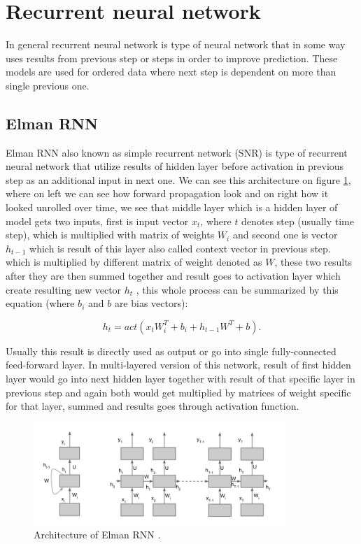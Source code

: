 \section{Recurrent neural network}
\label{theoryRNN}

In general recurrent neural network is type of neural network that in some way uses results from previous step or steps in order to improve prediction. These models are used for ordered data where next step is dependent on more than single previous one.

\subsection{Elman RNN}

Elman RNN also known as simple recurrent network (SNR) is type of recurrent neural network that utilize results of hidden layer before activation in previous step as an additional input in next one. We can see this architecture on figure \ref{fig:elman_arch}, where on left we can see how forward propagation look and on right how it looked unrolled over time, we see that middle layer which is a hidden layer of model gets two inputs, first is input vector $x_t$, where $t$ denotes step (usually time step), which is multiplied with matrix of weights $W_i$ and second one is vector $h_{t-1}$ which is result of this layer also called context vector in previous step. which is multiplied by different matrix of weight denoted as $W$, these two results after they are then summed together and result goes to activation layer which create resulting new vector $h_t$ \cite{elman}, this whole process can be summarized by this equation (where $b_i$ and $b$ are bias vectors):

\begin{equation}
	\label{eqn:elman}
	h_t = act(x_t W^T_i + b_i + h_{t-1} W^T + b).
\end{equation} 

Usually this result is directly used as output or go into single fully-connected feed-forward layer. In multi-layered version of this network, result of first hidden layer would go into next hidden layer together with result of that specific layer in previous step and again both would get multiplied by matrices of weight specific for that layer, summed and results goes through activation function.

\begin{figure}[!h]
	\centering
	
	\includegraphics[width=0.85\textwidth]{images/Elman_RNN_architecture.png}
	
	\caption{Architecture of Elman RNN \cite{elman_img}.}
	\label{fig:elman_arch}
\end{figure}

